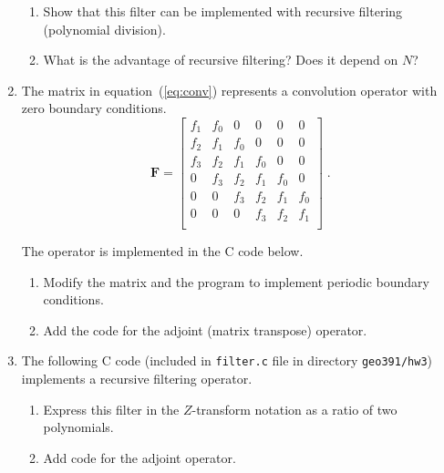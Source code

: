 \begin{enumerate}
\begin{enumerate}
\item Show that this filter can be implemented with recursive filtering (polynomial division).
\item What is the advantage of recursive filtering? Does it depend on $N$?
\end{enumerate}

\item The matrix in equation~(\ref{eq:conv}) represents a convolution operator with zero boundary conditions.
\begin{equation}
\label{eq:conv}
\mathbf{F} = \left[\begin{array}{llllll}
f_1 & f_0 & 0   & 0   & 0   & 0   \\
f_2 & f_1 & f_0 & 0   & 0   & 0   \\
f_3 & f_2 & f_1 & f_0 & 0   & 0   \\
0   & f_3 & f_2 & f_1 & f_0 & 0   \\
0   & 0   & f_3 & f_2 & f_1 & f_0 \\
0   & 0   & 0   & f_3 & f_2 & f_1 \\
\end{array}\right]\;.
\end{equation}

The operator is implemented in the C code below.

\lstset{language=c,numbers=left,numberstyle=\tiny,showstringspaces=false}


\begin{enumerate}
\item Modify the matrix and the program to implement periodic boundary conditions.
\item Add the code for the adjoint (matrix transpose) operator.
\end{enumerate}

\item The following C code (included in \texttt{filter.c} file in
  directory \texttt{geo391/hw3}) implements a recursive filtering
  operator.

\lstset{language=c,numbers=left,numberstyle=\tiny,showstringspaces=false}


\begin{enumerate}
\item Express this filter in the $Z$-transform notation as a ratio
  of two polynomials.
\item Add code for the adjoint operator.
\end{enumerate}


\end{enumerate}
